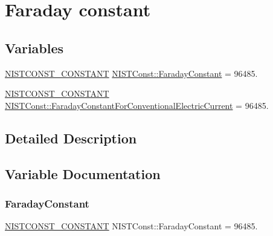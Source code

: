 \hypertarget{group___n_i_s_t_const-_faraday_constant}{}\section{Faraday constant}
\label{group___n_i_s_t_const-_faraday_constant}
\subsection*{Variables}
\begin{DoxyCompactItemize}
\item 
\mbox{\hyperlink{group___n_i_s_t_const-_macros_ga2b0fc1d7452373f816175dd86ce26729}{N\+I\+S\+T\+C\+O\+N\+S\+T\+\_\+\+C\+O\+N\+S\+T\+A\+NT}} \mbox{\hyperlink{group___n_i_s_t_const-_faraday_constant_ga4e412067c8c4bf008343b347a434f23a}{N\+I\+S\+T\+Const\+::\+Faraday\+Constant}} = 96485.
\item 
\mbox{\hyperlink{group___n_i_s_t_const-_macros_ga2b0fc1d7452373f816175dd86ce26729}{N\+I\+S\+T\+C\+O\+N\+S\+T\+\_\+\+C\+O\+N\+S\+T\+A\+NT}} \mbox{\hyperlink{group___n_i_s_t_const-_faraday_constant_gabb6fe7c894f8b742e96391914b960f5b}{N\+I\+S\+T\+Const\+::\+Faraday\+Constant\+For\+Conventional\+Electric\+Current}} = 96485.
\end{DoxyCompactItemize}


\subsection{Detailed Description}


\subsection{Variable Documentation}
\mbox{\label{group___n_i_s_t_const-_faraday_constant_ga4e412067c8c4bf008343b347a434f23a}} 
\subsubsection{\texorpdfstring{Faraday\+Constant}{FaradayConstant}}
{\footnotesize\ttfamily \mbox{\hyperlink{group___n_i_s_t_const-_macros_ga2b0fc1d7452373f816175dd86ce26729}{N\+I\+S\+T\+C\+O\+N\+S\+T\+\_\+\+C\+O\+N\+S\+T\+A\+NT}} N\+I\+S\+T\+Const\+::\+Faraday\+Constant = 96485.}

